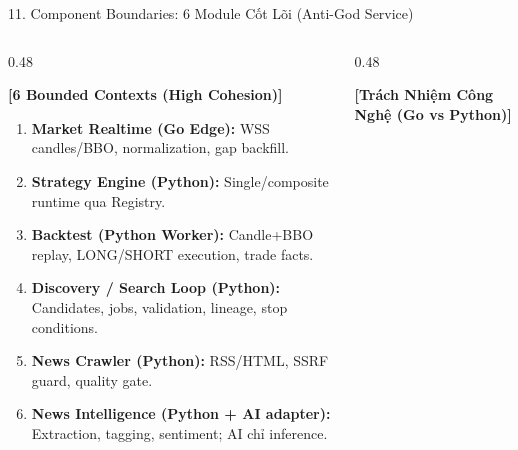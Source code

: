 \documentclass[aspectratio=169,10pt]{beamer}
\begin{document}
\begin{frame}{11. Component Boundaries: 6 Module Cốt Lõi (Anti-God Service)}
\begin{columns}[T]
\begin{column}{0.48\textwidth}
\begin{block}{\textbf{[6 Bounded Contexts (High Cohesion)]}}
\begin{enumerate}
  \item \textbf{Market Realtime (Go Edge):} WSS candles/BBO, normalization, gap backfill.
  \item \textbf{Strategy Engine (Python):} Single/composite runtime qua Registry.
  \item \textbf{Backtest (Python Worker):} Candle+BBO replay, LONG/SHORT execution, trade facts.
  \item \textbf{Discovery / Search Loop (Python):} Candidates, jobs, validation, lineage, stop conditions.
  \item \textbf{News Crawler (Python):} RSS/HTML, SSRF guard, quality gate.
  \item \textbf{News Intelligence (Python + AI adapter):} Extraction, tagging, sentiment; AI chỉ inference.
\end{enumerate}
\end{block}
\end{column}
\begin{column}{0.48\textwidth}
\begin{block}{\textbf{[Trách Nhiệm Công Nghệ (Go vs Python)]}}
\end{block}
\end{column}
\end{columns}
\end{frame}
\end{document}
